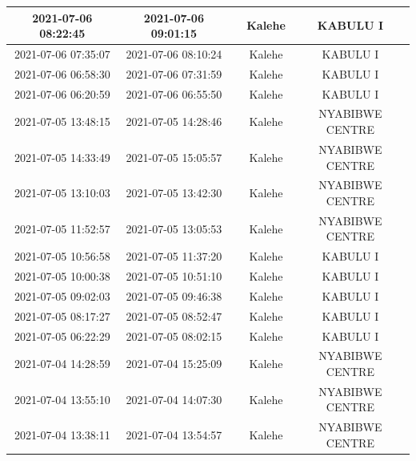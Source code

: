 \documentclass[
]{book}
\begin{document}
\begin{table}
\begin{tabular}[t]{c|c|>{}c|c|c}
\hline
2021-07-06 08:22:45 & 2021-07-06 09:01:15 & \cellcolor[HTML]{22A884}{\textcolor{white}{39}} & Kalehe & KABULU I\\
\hline
2021-07-06 07:35:07 & 2021-07-06 08:10:24 & \cellcolor[HTML]{3A548C}{\textcolor{white}{35}} & Kalehe & KABULU I\\
\hline
2021-07-06 06:58:30 & 2021-07-06 07:31:59 & \cellcolor[HTML]{443B84}{\textcolor{white}{33}} & Kalehe & KABULU I\\
\hline
2021-07-06 06:20:59 & 2021-07-06 06:55:50 & \cellcolor[HTML]{1F9A8A}{\textcolor{white}{35}} & Kalehe & KABULU I\\
\hline
2021-07-05 13:48:15 & 2021-07-05 14:28:46 & \cellcolor[HTML]{22A884}{\textcolor{white}{41}} & Kalehe & NYABIBWE CENTRE\\
\hline
2021-07-05 14:33:49 & 2021-07-05 15:05:57 & \cellcolor[HTML]{3A548C}{\textcolor{white}{32}} & Kalehe & NYABIBWE CENTRE\\
\hline
2021-07-05 13:10:03 & 2021-07-05 13:42:30 & \cellcolor[HTML]{1FA187}{\textcolor{white}{32}} & Kalehe & NYABIBWE CENTRE\\
\hline
2021-07-05 11:52:57 & 2021-07-05 13:05:53 & \cellcolor[HTML]{2A788E}{\textcolor{white}{73}} & Kalehe & NYABIBWE CENTRE\\
\hline
2021-07-05 10:56:58 & 2021-07-05 11:37:20 & \cellcolor[HTML]{FDE725}{\textcolor{white}{40}} & Kalehe & KABULU I\\
\hline
2021-07-05 10:00:38 & 2021-07-05 10:51:10 & \cellcolor[HTML]{2A788E}{\textcolor{white}{51}} & Kalehe & KABULU I\\
\hline
2021-07-05 09:02:03 & 2021-07-05 09:46:38 & \cellcolor[HTML]{440154}{\textcolor{white}{45}} & Kalehe & KABULU I\\
\hline
2021-07-05 08:17:27 & 2021-07-05 08:52:47 & \cellcolor[HTML]{365C8D}{\textcolor{white}{35}} & Kalehe & KABULU I\\
\hline
2021-07-05 06:22:29 & 2021-07-05 08:02:15 & \cellcolor[HTML]{414487}{\textcolor{white}{100}} & Kalehe & KABULU I\\
\hline
2021-07-04 14:28:59 & 2021-07-04 15:25:09 & \cellcolor[HTML]{69CD5B}{\textcolor{white}{56}} & Kalehe & NYABIBWE CENTRE\\
\hline
2021-07-04 13:55:10 & 2021-07-04 14:07:30 & \cellcolor[HTML]{482071}{\textcolor{white}{12}} & Kalehe & NYABIBWE CENTRE\\
\hline
2021-07-04 13:38:11 & 2021-07-04 13:54:57 & \cellcolor[HTML]{482979}{\textcolor{white}{17}} & Kalehe & NYABIBWE CENTRE\\

\end{tabular}
\end{table}
\end{document}
